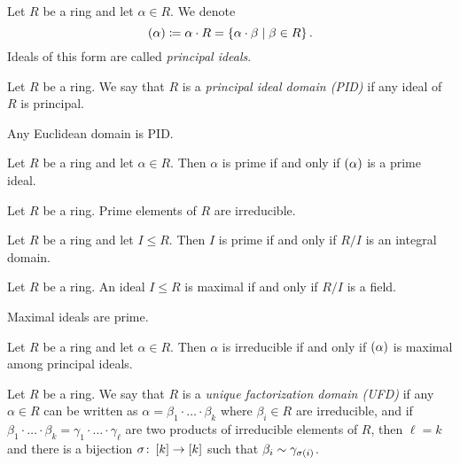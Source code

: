 \documentclass[11pt]{article}
\begin{document}
\begin{definition}
Let $R$ be a ring and let $\alpha \in R$. We denote
\[\prs{\alpha} \coloneqq \alpha \cdot R = \set{\alpha \cdot \beta}{\beta \in R} \text{.}\]
Ideals of this form are called \emph{principal ideals}.
\end{definition}

\begin{definition}
Let $R$ be a ring. We say that $R$ is a \emph{principal ideal domain (PID)} if any ideal of $R$ is principal.
\end{definition}

\begin{theorem}
Any Euclidean domain is PID.
\end{theorem}

\begin{lemma}
Let $R$ be a ring and let $\alpha \in R$. Then $\alpha$ is prime if and only if $\left( \alpha \right)$ is a prime ideal.
\end{lemma}

\begin{lemma}
Let $R$ be a ring. Prime elements of $R$ are irreducible.
\end{lemma}

\begin{exercise}
Let $R$ be a ring and let $I \leq R$. Then $I$ is prime if and only if $R/I$ is an integral domain.
\end{exercise}

\begin{exercise}
Let $R$ be a ring. An ideal $I \leq R$ is maximal if and only if $R/I$ is a field.
\end{exercise}

\begin{corollary}
Maximal ideals are prime.
\end{corollary}

\begin{exercise}
Let $R$ be a ring and let $\alpha \in R$. Then $\alpha$ is irreducible if and only if $\left( \alpha \right)$ is maximal among principal ideals.
\end{exercise}

\begin{definition}
Let $R$ be a ring. We say that $R$ is a \emph{unique factorization domain (UFD)} if any $\alpha \in R$ can be written as $\alpha = \beta_1 \cdot \ldots \cdot \beta_k$ where $\beta_i \in R$ are irreducible, and if $\beta_1 \cdot \ldots \cdot \beta_k = \gamma_1 \cdot \ldots \cdot \gamma_\ell$ are two products of irreducible elements  of $R$, then $\ell = k$ and there is a bijection $\sigma \colon \left[ k \right] \to \left[ k \right]$ such that $\beta_i \sim \gamma_{\sigma\left( i \right)}$.
\end{definition}
\end{document}
